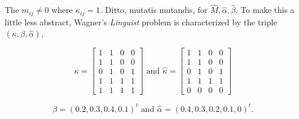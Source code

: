\documentclass[entropy,article,submit,oneauthor,pdftex,12pt,a4paper]{mdpi}
\newcommand{\intercal}{t}
\begin{document}

The $m_{ij}\neq{}0$ where $\kappa_{ij}=1$. Ditto, mutatis mutandis,
for $\hat{M},\hat{\alpha},\hat{\beta}$. To make this a little less
abstract, Wagner's \emph{Linguist} problem is characterized by the
triple $(\kappa,\beta,\hat{\alpha})$,

\begin{equation}
  \label{eq:m4}
  \kappa=\left[
  \begin{array}{cccc}
    1 & 1 & 0 & 0 \\
    1 & 1 & 0 & 0 \\
    0 & 1 & 0 & 1 \\
    1 & 1 & 1 & 1 \\
    1 & 1 & 1 & 1
  \end{array}
\right]\mbox{ and }
  \hat{\kappa}=\left[
  \begin{array}{cccc}
    1 & 1 & 0 & 0 \\
    1 & 1 & 0 & 0 \\
    0 & 1 & 0 & 1 \\
    1 & 1 & 1 & 1 \\
    0 & 0 & 0 & 0
  \end{array}
\right]
\end{equation}

\begin{equation}
  \label{eq:m5}
  \beta=(0.2,0.3,0.4,0.1)^{\intercal}\mbox{ and }\hat{\alpha}=(0.4,0.3,0.2,0.1,0)^{\intercal}.
\end{equation}
\end{document}
